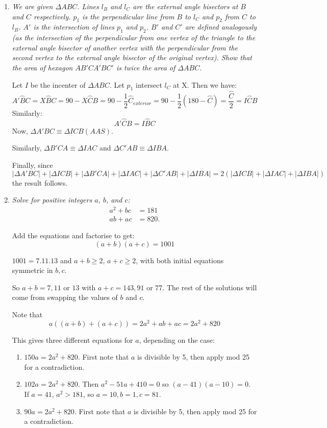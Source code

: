 \documentclass{article}
\begin{document}
\begin{enumerate}[1.]
\vspace{24pt}
\item %
{\itshape We are given ${\Delta ABC}$. Lines ${l_B}$ and ${l_C}$ are the external angle bisectors at ${B}$ and ${C}$ respectively. ${p_1}$ is the perpendicular line from ${B}$ to ${l_C}$ and ${p_2}$ from ${C}$ to ${l_B}$. ${A'}$ is the intersection of lines ${p_1}$ and ${p_2}$. ${B'}$ and ${C'}$ are defined analogously (as the intersection of \emph{the perpendicular from one vertex of the triangle to the external angle bisector of another vertex} with \emph{the perpendicular from the second vertex to the external angle bisector of the original vertex}). Show that the area of hexagon ${AB'CA'BC'}$ is twice the area of ${\Delta ABC}$.}

Let $I$ be the incenter of $\Delta ABC$. Let $p_1$ intersect $l_C$ at X. Then we have:
$$A'\hat{B}C = X\hat{B}C = 90 - X\hat{C}B = 90 - \frac{1}{2}\hat{C}_{exterior} = 90 - \frac{1}{2}(180-\hat{C}) = \frac{\hat{C}}{2} = I\hat{C}B$$
Similarly:
$$ A'\hat{C}B = I\hat{B}C$$
Now, $\Delta A'BC \equiv \Delta ICB (AAS)$.

Similarly, $\Delta B'CA \equiv \Delta IAC$ and $\Delta C'AB \equiv \Delta IBA$.

Finally, since $$|\Delta A'BC| + |\Delta ICB| + |\Delta B'CA| + |\Delta IAC| + |\Delta C'AB| + |\Delta IBA| = 2(|\Delta ICB| + |\Delta IAC| + |\Delta IBA|)$$the result follows.

\vspace{24pt}
\item %
{\itshape Solve for positive integers $a$, $b$, and $c$:
\begin{align*}
a^2 + bc &= 181\\
ab + ac &= 820.
\end{align*}}

Add the equations and factorise to get:
$$(a+b)(a+c)=1001$$

$1001 = 7.11.13$ and $a+b\geq2$, $a+c\geq2$, with both initial equations symmetric in $b,c$.

So $a+b=7,11$ or $13$ with $a+c=143,91$ or $77$. The rest of the solutions will come from swapping the values of $b$ and $c$.

Note that $$a((a+b)+(a+c))= 2a^2+ab+ac = 2a^2+820$$

This gives three different equations for $a$, depending on the case:
\begin{enumerate}
\item $150a = 2a^2+820$. First note that $a$ is divisible by 5, then apply mod 25 for a contradiction.
\item $102a = 2a^2+820$. Then $a^2 - 51a + 410 = 0$ so $(a-41)(a-10)=0$. If $a=41$, $a^2>181$, so $a=10, b=1, c=81$.
\item $90a = 2a^2+820$. First note that $a$ is divisible by 5, then apply mod 25 for a contradiction.
\end{enumerate}


\end{enumerate}
\end{document}
